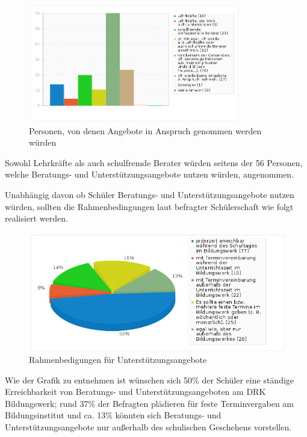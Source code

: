 \begin{figure}[hp]
	\centering
		\includegraphics[width=1.0\textwidth]{images/Von-welchen-Personen-wuerden-unterstuetzende-Angebote-angenommen.png}
	\caption{Personen, von denen Angebote in Anspruch genommen werden würden}
	\label{fig:Von-welchen-Personen-wuerden-unterstuetzende-Angebote-angenommen}
\end{figure}

\noindent
Sowohl Lehrkräfte als auch schulfremde Berater würden seitens der 56 Personen, welche Beratungs- und Unterstützungsangebote nutzen würden, angenommen. 

Unabhängig davon ob Schüler Beratungs- und Unterstützungsangebote nutzen würden, sollten die Rahmenbedingungen laut befragter Schülerschaft wie folgt realisiert werden. 

\begin{figure}[hp]
	\centering
		\includegraphics[width=1.0\textwidth]{images/Rahmenbedingungen-fuer-Unterstuetzungangebote.png}
	\caption{Rahmenbedigungen für Unterstützungsangebote}
	\label{fig:Rahmenbedingungen-fuer-Unterstuetzungangebote}
\end{figure}

\noindent
Wie der Grafik zu entnehmen ist wünschen sich 50\% der Schüler eine ständige Erreichbarkeit von Beratungs- und Unterstützungsangeboten am DRK Bildungswerk; rund 37\% der Befragten plädieren für feste Terminvergaben am Bildungsinstitut und ca. 13\% könnten sich Beratungs- und Unterstützungsangebote nur außerhalb des schulischen Geschehens vorstellen.\\


